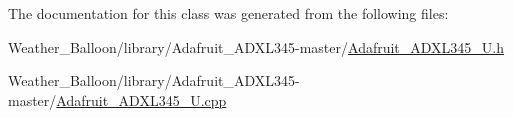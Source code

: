 The documentation for this class was generated from the following files\+:\begin{DoxyCompactItemize}
\item 
Weather\+\_\+\+Balloon/library/\+Adafruit\+\_\+\+A\+D\+X\+L345-\/master/\hyperlink{_adafruit___a_d_x_l345___u_8h}{Adafruit\+\_\+\+A\+D\+X\+L345\+\_\+\+U.\+h}\item 
Weather\+\_\+\+Balloon/library/\+Adafruit\+\_\+\+A\+D\+X\+L345-\/master/\hyperlink{_adafruit___a_d_x_l345___u_8cpp}{Adafruit\+\_\+\+A\+D\+X\+L345\+\_\+\+U.\+cpp}\end{DoxyCompactItemize}
